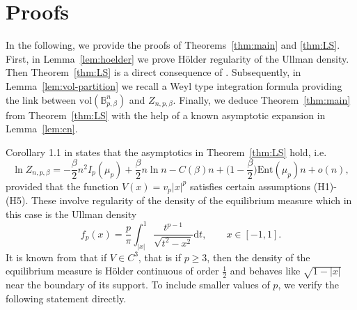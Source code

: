 \documentclass[a4paper,12pt,reqno]{amsart}
\theoremstyle{definition}
\newcommand{\Ent}{\mathrm{Ent}}
\newcommand{\vol}{\mathrm{vol}}
\newcommand{\dd}{\mathrm{d}}
\newcommand{\bpb}{\mathbb{B}_{p,\beta}^n}
\begin{document}
\section{Proofs}

In the following, we provide the proofs of Theorems~\ref{thm:main} and \ref{thm:LS}. First, in Lemma~\ref{lem:hoelder} we prove Hölder regularity of the Ullman density. Then Theorem~\ref{thm:LS} is a direct consequence of \cite{LS17}. Subsequently, in Lemma~\ref{lem:vol-partition} we recall a Weyl type integration formula providing the link between $\vol(\bpb)$ and $Z_{n,p,\beta}$. Finally, we deduce Theorem~\ref{thm:main} from Theorem~\ref{thm:LS} with the help of a known asymptotic expansion in Lemma~\ref{lem:cn}. 

Corollary 1.1 in \cite{LS17} states that the asymptotics in Theorem~\ref{thm:LS} hold, i.e.
\begin{equation} \label{eq:Z-LS}
\ln Z_{n,p,\beta}
=-\frac{\beta}{2}n^2 I_p(\mu_p)+\frac{\beta}{2}n\ln n-  C(\beta)n+\Big(1-\frac{\beta}{2}\Big)\Ent(\mu_p)n +o(n),
\end{equation}
provided that the function $V(x)=v_p |x|^p$ satisfies certain assumptions (H1)-(H5). These involve regularity of the density of the equilibrium measure which in this case is the Ullman density
\[
f_p(x)
= \frac{p}{\pi}\int_{|x|}^1 \frac{t^{p-1}}{\sqrt{t^2-x^2}}\dd t,\qquad x\in [-1,1].
\]
It is known from \cite[Thm.~1.34]{DKM98} that if $V\in C^3$, that is if $p\ge 3$, then the density of the equilibrium measure is Hölder continuous of order $\frac{1}{2}$ and behaves like $\sqrt{1-|x|}$ near the boundary of its support. To include smaller values of $p$, we verify the following statement directly. 
\end{document}
